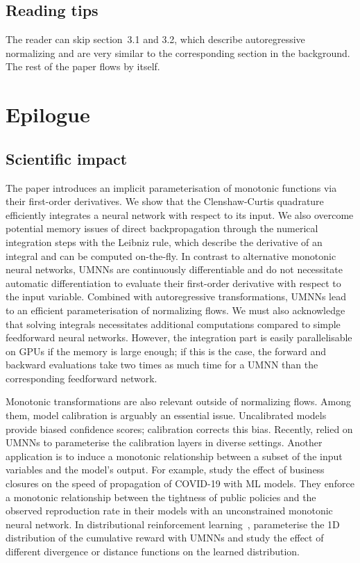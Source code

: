 \subsection{Reading tips}
The reader can skip section~3.1 and 3.2, which describe autoregressive normalizing and are very similar to the corresponding section in the background. The rest of the paper flows by itself.



\section{Epilogue} \label{epi:ch05}

\subsection{Scientific impact}
The paper introduces an implicit parameterisation of monotonic functions via their first-order derivatives. We show that the Clenshaw-Curtis quadrature efficiently integrates a neural network with respect to its input. We also overcome potential memory issues of direct backpropagation through the numerical integration steps with the Leibniz rule, which describe the derivative of an integral and can be computed on-the-fly. In contrast to alternative monotonic neural networks, UMNNs are continuously differentiable and do not necessitate automatic differentiation to evaluate their first-order derivative with respect to the input variable. Combined with autoregressive transformations, UMNNs lead to an efficient parameterisation of normalizing flows. We must also acknowledge that solving integrals necessitates additional computations compared to simple feedforward neural networks. However, the integration part is easily parallelisable on GPUs if the memory is large enough; if this is the case, the forward and backward evaluations take two times as much time for a UMNN than the corresponding feedforward network.

Monotonic transformations are also relevant outside of normalizing flows. Among them, model calibration is arguably an essential issue. Uncalibrated models provide biased confidence scores; calibration corrects this bias. Recently, \citet{gruber2022trustworthy, deycalibrated, rahimi2020intra} relied on UMNNs to parameterise the calibration layers in diverse settings. Another application is to induce a monotonic relationship between a subset of the input variables and the model's output. For example, \citet{yurk2021county} study the effect of business closures on the speed of propagation of COVID-19 with ML models. They enforce a monotonic relationship between the tightness of public policies and the observed reproduction rate in their models with an unconstrained monotonic neural network. In distributional reinforcement learning~\citep{dabney2018distributional}, \citet{theate2021distributional} parameterise the 1D distribution of the cumulative reward with UMNNs and study the effect of different divergence or distance functions on the learned distribution.

